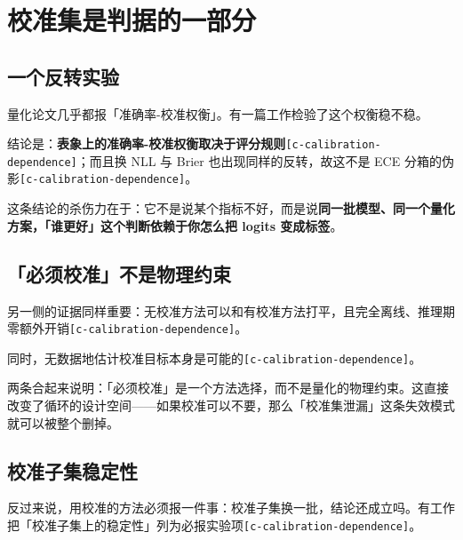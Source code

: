 \section{校准集是判据的一部分}

\subsection{一个反转实验}

量化论文几乎都报「准确率-校准权衡」。有一篇工作检验了这个权衡稳不稳。


结论是：\textbf{表象上的准确率-校准权衡取决于评分规则}{\scriptsize\texttt{[c-\hspace{0pt}calibration-\hspace{0pt}dependence]}}；而且换 NLL 与 Brier 也出现同样的反转，故这不是 ECE 分箱的伪影{\scriptsize\texttt{[c-\hspace{0pt}calibration-\hspace{0pt}dependence]}}。


这条结论的杀伤力在于：它不是说某个指标不好，而是说\textbf{同一批模型、同一个量化方案，「谁更好」这个判断依赖于你怎么把 logits 变成标签}。


\subsection{「必须校准」不是物理约束}

另一侧的证据同样重要：无校准方法可以和有校准方法打平，且完全离线、推理期零额外开销{\scriptsize\texttt{[c-\hspace{0pt}calibration-\hspace{0pt}dependence]}}。


同时，无数据地估计校准目标本身是可能的{\scriptsize\texttt{[c-\hspace{0pt}calibration-\hspace{0pt}dependence]}}。


两条合起来说明：「必须校准」是一个方法选择，而不是量化的物理约束。这直接改变了循环的设计空间——如果校准可以不要，那么「校准集泄漏」这条失效模式就可以被整个删掉。


\subsection{校准子集稳定性}

反过来说，用校准的方法必须报一件事：校准子集换一批，结论还成立吗。有工作把「校准子集上的稳定性」列为必报实验项{\scriptsize\texttt{[c-\hspace{0pt}calibration-\hspace{0pt}dependence]}}。


